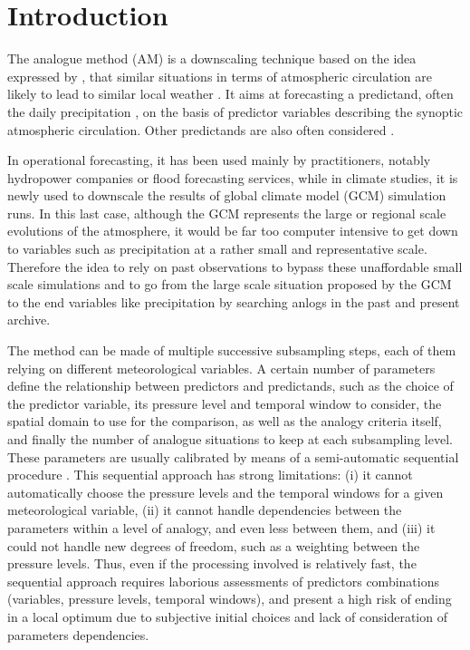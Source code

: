 \documentclass[5p]{elsarticle}
\begin{document}
\linenumbers

\section{Introduction}
\label{sec:intro}

The analogue method (AM) is a downscaling technique based on the idea expressed by \citet{Lorenz1956, Lorenz1969}, that similar situations in terms of atmospheric circulation are likely to lead to similar local weather \citep{Duband1970, Bontron2005}. It aims at forecasting a predictand, often the daily precipitation \citep[eg.]{Guilbaud1997, Bontron2005, Bliefernicht2010, Marty2012, Horton2012, Radanovics2013, BenDaoud2015}, on the basis of predictor variables describing the synoptic atmospheric circulation. Other predictands are also often considered \citep[see][for a non-exhaustive list]{Horton2016}.

In operational forecasting, it has been used mainly by practitioners, notably hydropower companies or flood forecasting services, while in climate studies, it is newly used to downscale the results of global climate model (GCM) simulation runs. In this last case, although the GCM represents the large or regional scale evolutions of the atmosphere, it would be far too computer intensive to get down to variables such as precipitation at a rather small and representative scale. Therefore the idea to rely on past observations to bypass these unaffordable small scale simulations and to go from the large scale situation proposed by the GCM to the end variables like precipitation by searching anlogs in the past and present archive. 

The method can be made of multiple successive subsampling steps, each of them relying on different meteorological variables. A certain number of parameters define the relationship between predictors and predictands, such as the choice of the predictor variable, its pressure level and temporal window to consider, the spatial domain to use for the comparison, as well as the analogy criteria itself, and finally the number of analogue situations to keep at each subsampling level. These parameters are usually calibrated by means of a semi-automatic sequential procedure \citep[see][for the details]{Bontron2004, Horton2016}. This sequential approach has strong limitations: (i) it cannot automatically choose the pressure levels and the temporal windows for a given meteorological variable, (ii) it cannot handle dependencies between the parameters within a level of analogy, and even less between them, and (iii) it could not handle new degrees of freedom, such as a weighting between the pressure levels. Thus, even if the processing involved is relatively fast, the sequential approach requires laborious assessments of predictors combinations (variables, pressure levels, temporal windows), and present a high risk of ending in a local optimum due to subjective initial choices and lack of consideration of parameters dependencies.
\end{document}
